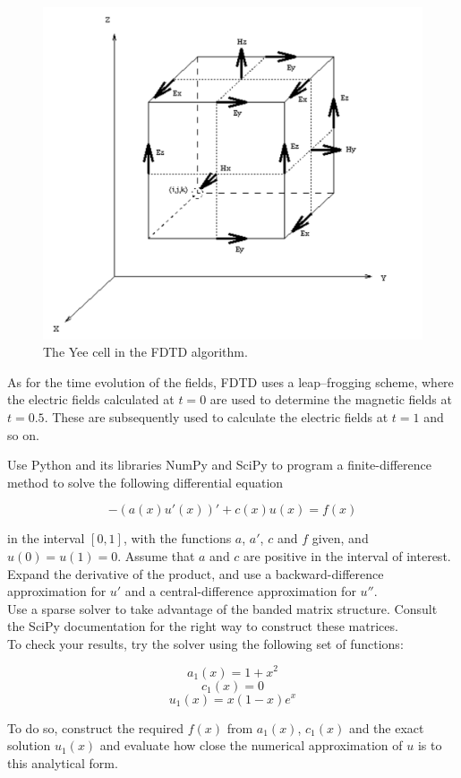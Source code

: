 \begin{figure}
\centering
\includegraphics{numeric/figures/yeecell}
\caption{The Yee cell in the FDTD algorithm.}
\label{fig-yee}
\end{figure}

As for the time evolution of the fields, FDTD uses a leap--frogging scheme, where the electric fields calculated at $t=0$ are used to determine the magnetic fields at $t=0.5$. These are subsequently used to calculate the electric fields at $t=1$ and so on.


\begin{exer}
Use Python and its libraries NumPy and SciPy to program a finite-difference method to solve the following differential equation

$$ -\left(a(x) u'(x) \right)' + c(x)u(x) = f(x)$$

in the interval $[0,1]$, with the functions $a$, $a'$, $c$ and $f$ given, and $u(0) = u(1) = 0$. Assume that $a$ and $c$ are positive in the interval of interest.\\

Expand the derivative of the product, and use a backward-difference approximation for $u'$ and a central-difference approximation for $u''$. \\

Use a sparse solver to take advantage of the banded matrix structure. Consult the SciPy documentation for the right way to construct these matrices. \\

To check your results, try the solver using the following set of functions:

$$a_1(x) = 1 + x^2$$
$$c_1(x) = 0$$
$$u_1(x) = x(1-x) e^x $$

To do so, construct the required $f(x)$ from $a_1(x)$, $c_1(x)$ and the exact solution $u_1(x)$ and evaluate how close the numerical approximation of $u$ is to this analytical form.

\end{exer}



